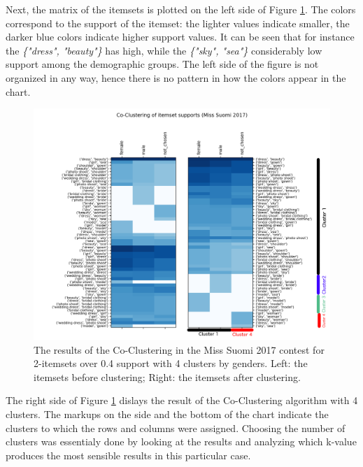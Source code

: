 Next, the matrix of the itemsets is plotted on the left side of Figure \ref{coclustering_miss-suomi-genders-2-itemsets-04_support}. The colors correspond to the support of the itemset: the lighter values indicate smaller, the darker blue colors indicate higher support values. It can be seen that for instance the \emph{\{"dress", "beauty"\}} has high, while the \emph{\{"sky", "sea"\}} considerably low support among the demographic groups. The left side of the figure is not organized in any way, hence there is no pattern in how the colors appear in the chart. 

\begin{figure}[h] 
    \begin{center}
        \includegraphics[width=1.0\textwidth]{Images/coclustering_miss-suomi-genders-2-itemsets-04_support.png}
        \caption{The results of the Co-Clustering in the Miss Suomi 2017 contest for 2-itemsets over 0.4 support with 4 clusters by genders. Left: the itemsets before clustering; Right: the itemsets after clustering.}
        \label{coclustering_miss-suomi-genders-2-itemsets-04_support}
    \end{center}
\end{figure}

The right side of Figure \ref{coclustering_miss-suomi-genders-2-itemsets-04_support} dislays the result of the Co-Clustering algorithm with 4 clusters. The markups on the side and the bottom of the chart indicate the clusters to which the rows and columns were assigned. Choosing the number of clusters was essentialy done by looking at the results and analyzing which k-value produces the most sensible results in this particular case. 

